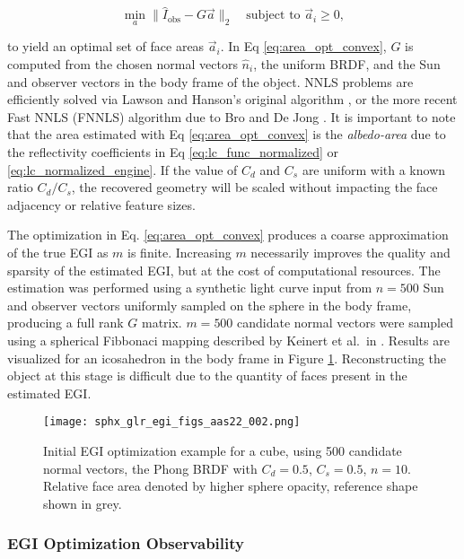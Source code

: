 \begin{equation} \label{eq:area_opt_convex}
  \min_{a}{\|\hat{I}_{\textrm{obs}} - G \vec{a}\|_2} \:\:\: \textrm{ subject to } \vec{a}_i \geq 0,
\end{equation}

to yield an optimal set of face areas $\vec{a}_i$. In Eq \ref{eq:area_opt_convex}, $G$ is computed from the chosen normal vectors $\hat{n}_i$, the uniform BRDF, and the Sun and observer vectors in the body frame of the object. NNLS problems are efficiently solved via Lawson and Hanson's original algorithm \cite{lawson1976}, or the more recent Fast NNLS (FNNLS) algorithm due to Bro and De Jong \cite{bro1996}. It is important to note that the area estimated with Eq \ref{eq:area_opt_convex} is the \textit{albedo-area} due to the reflectivity coefficients in Eq \ref{eq:lc_func_normalized} or \ref{eq:lc_normalized_engine}. If the value of $C_d$ and $C_s$ are uniform with a known ratio $C_d / C_s$, the recovered geometry will be scaled without impacting the face adjacency or relative feature sizes.

The optimization in Eq. \ref{eq:area_opt_convex} produces a coarse approximation of the true EGI as $m$ is finite. Increasing $m$ necessarily improves the quality and sparsity of the estimated EGI, but at the cost of computational resources. The estimation was performed using a synthetic light curve input from $n=500$ Sun and observer vectors uniformly sampled on the sphere in the body frame, producing a full rank $G$ matrix. $m = 500$ candidate normal vectors were sampled using a spherical Fibbonaci mapping described by Keinert et al.\ in \cite{keinert2015}. Results are visualized for an icosahedron in the body frame in Figure \ref{fig:initial_egi_sampling}. Reconstructing the object at this stage is difficult due to the quantity of faces present in the estimated EGI. 

\graphicspath{{/Users/liamrobinson/Documents/PyLightCurves/docs/build/html/_images}}
\begin{figure}[!htb]
  \centering
  \texttt{[image: sphx\_glr\_egi\_figs\_aas22\_002.png]}
  \caption{Initial EGI optimization example for a cube, using 500 candidate normal vectors, the Phong BRDF with $C_d=0.5$, $C_s=0.5$, $n=10$. Relative face area denoted by higher sphere opacity, reference shape shown in grey.}
  \label{fig:initial_egi_sampling}
\end{figure}

\subsubsection{EGI Optimization Observability}

